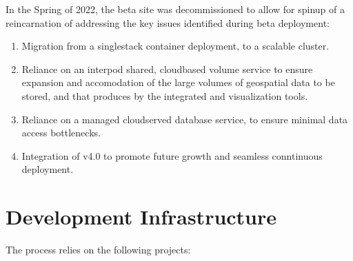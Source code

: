 \documentclass[letterpaper,12pt,english,openany,oneside]{sphinxmanual}
\begin{document}
\sphinxAtStartPar
In the Spring of 2022, the beta site was decommissioned to allow for spin\sphinxhyphen{}up of a re\sphinxhyphen{}incarnation of {\hyperref[\detokenize{_static/glossary:term-RGVFlood.com}]{}} addressing the key issues identified during beta deployment:
\begin{enumerate}
%
\item {} 
\sphinxAtStartPar
Migration from a single\sphinxhyphen{}stack {\hyperref[\detokenize{_static/glossary:term-Docker}]{}} container deployment, to a scalable {\hyperref[\detokenize{_static/glossary:term-Kubernetes}]{}} cluster.

\item {} 
\sphinxAtStartPar
Reliance on an inter\sphinxhyphen{}pod shared, cloud\sphinxhyphen{}based {\hyperref[\detokenize{_static/glossary:term-NFS}]{}} volume service to ensure expansion and accomodation of the large volumes of geospatial data to be stored, and that produces by the integrated {\hyperref[\detokenize{_static/glossary:term-H-H}]{}} and visualization tools.

\item {} 
\sphinxAtStartPar
Reliance on a managed cloud\sphinxhyphen{}served database service, to ensure minimal data access bottle\sphinxhyphen{}necks.

\item {} 
\sphinxAtStartPar
Integration of {\hyperref[\detokenize{_static/glossary:term-0}]{}} v4.0 to promote future growth and seamless conntinuous deployment.

\end{enumerate}

\sphinxstepscope


\section{Development Infrastructure}
\label{\detokenize{euidev/development/index:development-infrastructure}}\label{\detokenize{euidev/development/index::doc}}
\sphinxAtStartPar
The {\hyperref[\detokenize{_static/glossary:term-RGVFlood.com}]{}} {\hyperref[\detokenize{_static/glossary:term-CI-CD}]{}} process relies on the following {\hyperref[\detokenize{_static/glossary:term-RATES}]{}} projects:
\end{document}
